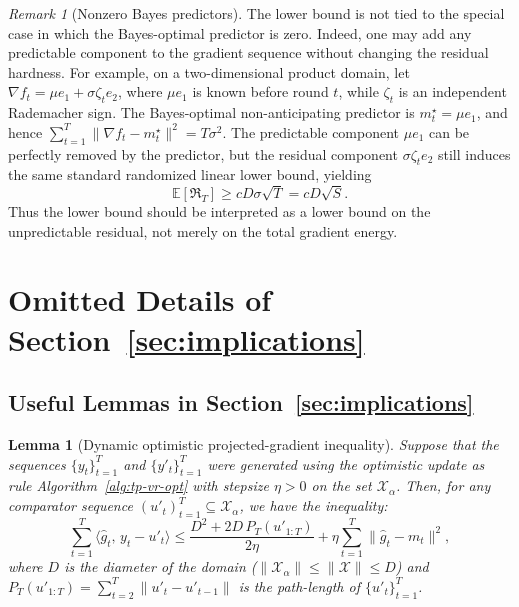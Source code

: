 \documentclass[journal,onecolumn]{IEEEtran}
\newcommand{\cX}{\mathcal{X}}
\theoremstyle{plain}
\newtheorem{lemma}[theorem]{Lemma}
\theoremstyle{definition}
\theoremstyle{remark}
\newtheorem{remark}[theorem]{Remark}
\newcommand{\regret}{\mathfrak{R}}
\begin{document}
{\begin{remark}[Nonzero Bayes predictors]
The lower bound is not tied to the special case in which the Bayes-optimal
predictor is zero. Indeed, one may add any predictable component to the
gradient sequence without changing the residual hardness. For example, on a
two-dimensional product domain, let $\nabla f_t = \mu e_1 + \sigma \zeta_t e_2$,
where $\mu e_1$ is known before round $t$, while $\zeta_t$ is an
independent Rademacher sign. The Bayes-optimal non-anticipating predictor is
$m_t^\star=\mu e_1$, and hence
$\sum_{t=1}^T \|\nabla f_t-m_t^\star\|^2=T\sigma^2$. The predictable component $\mu e_1$ can be perfectly removed by the
predictor, but the residual component $\sigma\zeta_t e_2$ still induces the
same standard randomized linear lower bound, yielding
\begin{equation*}
    \mathbb E[\regret_T]\ge cD\sigma\sqrt T
    =
    cD\sqrt{S}.
\end{equation*}
Thus the lower bound should be interpreted as a lower bound on the
unpredictable residual, not merely on the total gradient energy.
\end{remark}


\section{Omitted Details of Section~\ref{sec:implications}}
\label{app:implications}

\subsection{Useful Lemmas in Section~\ref{sec:implications}}

\begin{lemma}[Dynamic optimistic projected-gradient inequality]
    \label{lem:dynamic_optimistic_ineq} Suppose that the sequences $\{y_{t}\}_{t=1}^{T}$ and $\{y'_{t}\}_{t=1}^{T}$ were generated using the optimistic update as rule Algorithm~\ref{alg:tp-vr-opt} with stepsize $\eta > 0$ on the set $\mathcal{X}_{\alpha}$. Then, for any comparator sequence $(u'_{t})_{t=1}^{T} \subseteq \mathcal{X}_{\alpha}$, we have the inequality:
    \begin{equation*}
        \sum_{t=1}^{T} \langle \hat g_{t},\, y_{t}-u'_{t}\rangle \le\frac{D^{2}+2D\,P_{T}(u'_{1:T})}{2\eta}
        +\eta\sum_{t=1}^{T} \|\hat g_{t}-m_{t}\|^{2},
    \end{equation*}
    where $D$ is the diameter of the domain ($\|\cX_{\alpha}\|\leq\|\cX\|\leq D$) and $P_{T}(u'_{1:T})=\sum_{t=2}^{T}\|u'_{t}-u'_{t-1}\|$ is the path-length of $\{u'_{t}\}_{t=1}^T$.
\end{lemma}

}
\end{document}
